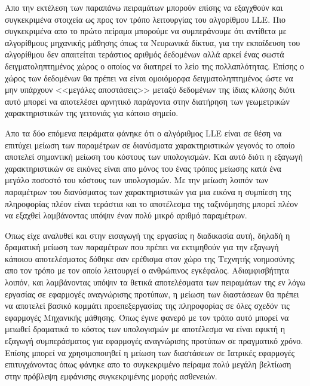 \par
Απο την εκτέλεση των παραπάνω πειραμάτων μπορούν επίσης να εξαγχθούν και συγκεκριμένα στοιχεία ως προς τον τρόπο λειτουργίας του αλγορίθμου \textlatin{LLE}. Πιο συγκεκριμένα απο το πρώτο πείραμα μπορούμε να συμπεράνουμε ότι αντίθετα με αλγορίθμους μηχανικής μάθησης όπως τα Νευρωνικά δίκτυα, για την εκπαίδευση του αλγορίθμου δεν απαιτείται τεράστιος αριθμός δεδομένων αλλά αρκεί ένας σωστά δειγματοληπτημένος χώρος ο οποίος να διατηρεί το λείο της πολλαπλότητας. Επίσης ο χώρος των δεδομένων θα πρέπει να είναι ομοιόμορφα δειγματοληπτημένος ώστε να μην υπάρχουν <<μεγάλες αποστάσεις>> μεταξύ δεδομένων της ίδιας κλάσης διότι αυτό μπορεί να αποτελέσει αρνητικό παράγοντα στην διατήρηση των γεωμετρικών χαρακτηριστικών της γειτονιάς για κάποιο σημείο.
\par
Απο τα δύο επόμενα πειράματα φάνηκε ότι ο αλγόριθμος \textlatin{LLE} είναι σε θέση να επιτύχει μείωση των παραμέτρων σε διανύσματα χαρακτηριστικών γεγονός το οποίο αποτελεί σημαντική μείωση του κόστους των υπολογισμών. Και αυτό διότι η εξαγωγή χαρακτηριστικών σε εικόνες είναι απο μόνος του ένας τρόπος μείωσης κατά ένα μεγάλο ποσοστό του κόστους των υπολογισμών. Με την μείωση λοιπόν των παραμέτρων του διανύσματος των χαρακτηριστικών για μια εικόνα η συμπίεση της πληροφορίας πλέον είναι τεράστια και το αποτέλεσμα της ταξινόμησης μπορεί πλέον να εξαχθεί λαμβάνοντας υπόψιν έναν πολύ μικρό αριθμό παραμέτρων. 
\par
Όπως είχε αναλυθεί και στην εισαγωγή της εργασίας η διαδικασία αυτή, δηλαδή η δραματική μείωση των παραμέτρων που πρέπει να εκτιμηθούν για την εξαγωγή κάποιου αποτελέσματος δόθηκε σαν ερέθισμα στον χώρο της Τεχνητής νοημοσύνης απο τον τρόπο με τον οποίο λειτουργεί ο ανθρώπινος εγκέφαλος. Αδιαμφισβήτητα λοιπόν, και λαμβάνοντας υπόψιν τα θετικά αποτελέσματα των πειραμάτων της εν λόγω εργασίας σε εφαρμογές αναγνώρισης προτύπων, η μείωση των διαστάσεων θα πρέπει να αποτελεί βασικό κομμάτι προεπεξεργασίας της πληροφορίας σε όλες σχεδόν τις εφαρμογές Μηχανικής μάθησης. Όπως έγινε φανερό με τον τρόπο αυτό μπορεί να μειωθεί δραματικά το κόστος των υπολογισμών με αποτέλεσμα να είναι εφικτή η εξαγωγή συμπεράσματος για εφαρμογές αναγνώρισης προτύπων σε πραγματικό χρόνο. Επίσης μπορεί να χρησιμοποιηθεί η μείωση των διαστάσεων σε Ιατρικές εφαρμογές επιτυγχάνοντας όπως φάνηκε απο το συγκεκριμένο πείραμα πολύ μεγάλη βελτίωση στην πρόβλεψη εμφάνισης συγκεκριμένης μορφής ασθενειών.
\par
